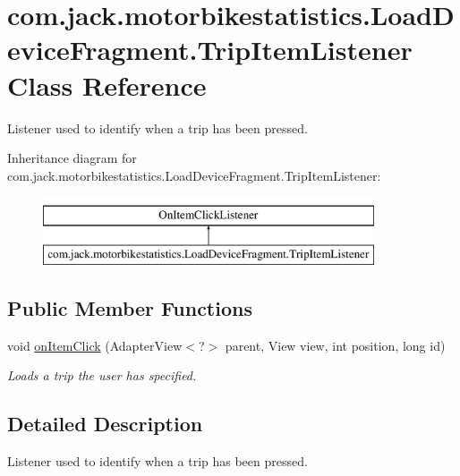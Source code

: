 \hypertarget{classcom_1_1jack_1_1motorbikestatistics_1_1_load_device_fragment_1_1_trip_item_listener}{}\section{com.\+jack.\+motorbikestatistics.\+Load\+Device\+Fragment.\+Trip\+Item\+Listener Class Reference}
\label{classcom_1_1jack_1_1motorbikestatistics_1_1_load_device_fragment_1_1_trip_item_listener}


Listener used to identify when a trip has been pressed.  


Inheritance diagram for com.\+jack.\+motorbikestatistics.\+Load\+Device\+Fragment.\+Trip\+Item\+Listener\+:\begin{figure}[H]
\begin{center}
\leavevmode
\includegraphics[height=2.000000cm]{classcom_1_1jack_1_1motorbikestatistics_1_1_load_device_fragment_1_1_trip_item_listener}
\end{center}
\end{figure}
\subsection*{Public Member Functions}
\begin{DoxyCompactItemize}
\item 
void \hyperlink{classcom_1_1jack_1_1motorbikestatistics_1_1_load_device_fragment_1_1_trip_item_listener_a35dc92993831e354573218d4300a2f2a}{on\+Item\+Click} (Adapter\+View$<$?$>$ parent, View view, int position, long id)
\begin{DoxyCompactList}\small\item\em Loads a trip the user has specified. \end{DoxyCompactList}\end{DoxyCompactItemize}


\subsection{Detailed Description}
Listener used to identify when a trip has been pressed. 

